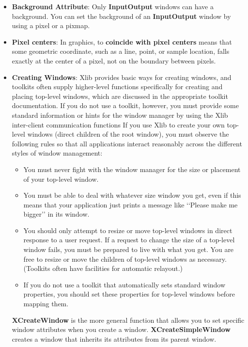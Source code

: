 \documentclass{report}
\begin{document}
\begin{itemize}
        \item \textbf{Background Attribute}: Only \textbf{InputOutput} windows can have a background. You can set the background of an \textbf{InputOutput} window by using a pixel or a pixmap.
        \item \textbf{Pixel centers}: In graphics, to \textbf{coincide with pixel centers} means that some geometric coordinate, such as a line, point, or sample location, falls exactly at the center of a pixel, not on the boundary between pixels.
        \item \textbf{Creating Windows}: Xlib provides basic ways for creating windows, and toolkits often supply higher-level functions specifically for creating and placing top-level windows, which are discussed in the appropriate toolkit documentation. If you do not use a toolkit, however, you must provide some standard information or hints for the window manager by using the Xlib inter-client communication functions 
            \bigbreak \noindent 
            If you use Xlib to create your own top-level windows (direct children of the root window), you must observe the following rules so that all applications interact reasonably across the different styles of window management:
            \begin{itemize}
                \item You must never fight with the window manager for the size or placement of your top-level window.
                \item You must be able to deal with whatever size window you get, even if this means that your application just prints a message like ‘‘Please make me bigger’’ in its window.
                \item You should only attempt to resize or move top-level windows in direct response to a user request. If a request to change the size of a top-level window fails, you must be prepared to live with what you get. You are free to resize or move the children of top-level windows as necessary. (Toolkits often have facilities for automatic relayout.)
                \item If you do not use a toolkit that automatically sets standard window properties, you should set these properties for top-level windows before mapping them.
            \end{itemize}
            \textbf{XCreateWindow} is the more general function that allows you to set specific window attributes when you create a window. \textbf{XCreateSimpleWindow} creates a window that inherits its attributes from its parent window.

\end{itemize}
\end{document}
